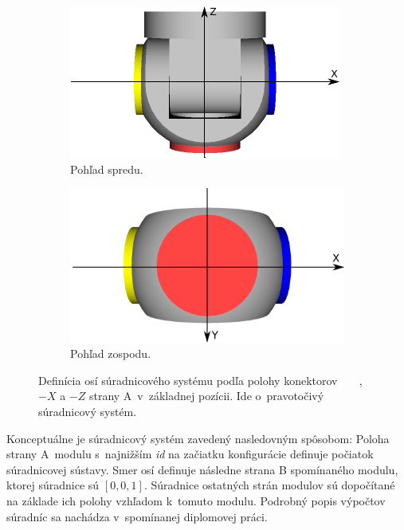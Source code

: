 \documentclass[
  printed, %
  oneside, %
  notable,   %
  nolof,     %
  nolot,     %
]{fithesis3}
\begin{document}
\begin{figure}[hbt!]
    \centering
    \begin{subfigure}[b]{0.49\textwidth}
        \includegraphics[width=\textwidth]{pictures/module_dock_identification.pdf}
        \caption[Pohľad spredu]{Pohľad spredu.}
    \end{subfigure}
    \begin{subfigure}[b]{0.49\textwidth}
        \includegraphics[width=\textwidth]{pictures/module_dock_identification_bottom.pdf}
        \caption[Pohľad zospodu]{Pohľad zospodu.}
    \end{subfigure}
    \caption[Definícia osí súradnicového systému]{Definícia osí súradnicového systému podľa polohy konektorov \textcolor{white}{\colorbox{modra}{$+X$}}, \colorbox{zlta}{$-X$} a \colorbox{cervena}{$-Z$} strany A~v~základnej pozícii. Ide o~pravotočivý súradnicový systém. }
    \label{fig:moduleAxis}
\end{figure}

Konceptuálne je súradnicový systém zavedený nasledovným spôsobom: Poloha strany A~modulu s~najnižším \textit{id} na začiatku konfigurácie definuje počiatok súradnicovej sústavy. Smer osí definuje následne strana B spomínaného modulu, ktorej súradnice sú $[0, 0, 1]$. Súradnice ostatných strán modulov sú dopočítané na základe ich polohy vzhľadom k~tomuto modulu. Podrobný popis výpočtov súradníc sa nachádza v~spomínanej diplomovej práci.  
\end{document}
